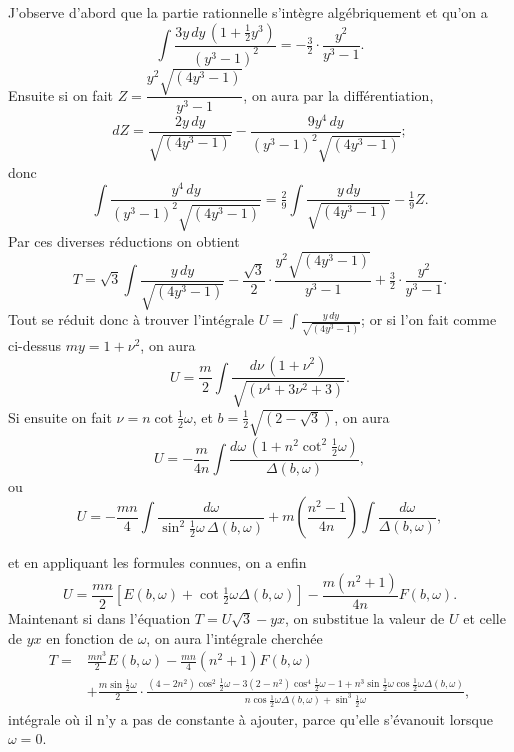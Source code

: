 \documentclass{article}
\begin{document}
J'observe d'abord que la partie rationnelle s'intègre algébriquement et qu'on a
\[ \int\frac{3y\,dy\,(1+\tfrac{1}{2}y^{3})}{(y^{3}-1)^{2}}=-\tfrac{3}{2}\cdot\frac{y^{2}}{y^{3}-1}. \]
Ensuite si on fait $Z=\dfrac{y^{2}\sqrt{(4y^{3}-1)}}{y^{3}-1}$, on aura par la différentiation,
\[ dZ=\frac{2y\,dy}{\sqrt{(4y^{3}-1)}}-\frac{9y^{4}\,dy}{(y^{3}-1)^{2}\sqrt{(4y^{3}-1)}}; \]
donc
\[ \int\frac{y^{4}\,dy}{(y^{3}-1)^{2}\sqrt{(4y^{3}-1)}}=\tfrac{2}{9}\int\frac{y\,dy}{\sqrt{(4y^{3}-1)}}-\tfrac{1}{9}Z. \]
Par ces diverses réductions on obtient
\[ T=\sqrt{3}\int\frac{y\,dy}{\sqrt{(4y^{3}-1)}}-\frac{\sqrt{3}}{2}\cdot\frac{y^{2}\sqrt{(4y^{3}-1)}}{y^{3}-1}+\tfrac{3}{2}\cdot\frac{y^{2}}{y^{3}-1}. \]
Tout se réduit donc à trouver l'intégrale $U=\displaystyle\int\frac{y\,dy}{\sqrt{(4y^{3}-1)}}$; or si l'on fait comme ci-dessus $my=1+\nu^{2}$, on aura
\[ U=\frac{m}{2}\int\frac{d\nu\,(1+\nu^{2})}{\sqrt{(\nu^{4}+3\nu^{2}+3)}}. \]
Si ensuite on fait $\nu=n\cot\frac{1}{2}\omega$, et $b=\frac{1}{2}\sqrt{(2-\sqrt{3})}$, on aura
\[ U=-\frac{m}{4n}\int\frac{d\omega\,(1+n^{2}\cot^{2}\tfrac{1}{2}\omega)}{\Delta(b,\omega)}, \]
ou
\[ U=-\frac{mn}{4}\int\frac{d\omega}{\sin^{2}\tfrac{1}{2}\omega\,\Delta(b,\omega)}+m\left(\frac{n^{2}-1}{4n}\right)\int\frac{d\omega}{\Delta(b,\omega)}, \]

et en appliquant les formules connues, on a enfin
\[ U=\frac{mn}{2}[E(b,\omega)+\cot\tfrac{1}{2}\omega\Delta(b,\omega)]-\frac{m(n^{2}+1)}{4n}F(b,\omega). \]
Maintenant si dans l'équation $T=U\sqrt{3}-yx$, on substitue la valeur de $U$ et celle de $yx$ en fonction de $\omega$, on aura l'intégrale cherchée
\[ \begin{aligned} T={}&\frac{mn^{3}}{2}E(b,\omega)-\frac{mn}{4}(n^{2}+1)F(b,\omega)\\ &+\frac{m\sin\tfrac{1}{2}\omega}{2}\cdot\frac{(4-2n^{2})\cos^{2}\tfrac{1}{2}\omega-3(2-n^{2})\cos^{4}\tfrac{1}{2}\omega-1+n^{3}\sin\tfrac{1}{2}\omega\cos\tfrac{1}{2}\omega\Delta(b,\omega)}{n\cos\tfrac{1}{2}\omega\Delta(b,\omega)+\sin^{3}\tfrac{1}{2}\omega}, \end{aligned} \]
intégrale où il n'y a pas de constante à ajouter, parce qu'elle s'évanouit lorsque $\omega=0$.
\end{document}
